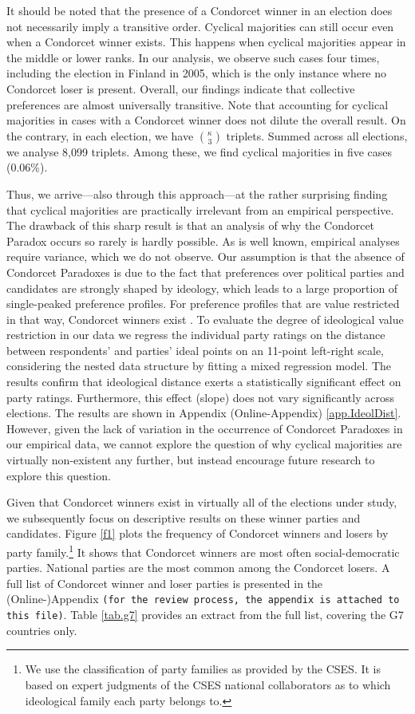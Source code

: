 \documentclass[12pt]{scrartcl}
\begin{document}
It should be noted that the presence of a Condorcet winner in an election does not necessarily imply a transitive order. Cyclical majorities can still occur even when a Condorcet winner exists. This happens when cyclical majorities appear in the middle or lower ranks. In our analysis, we observe such cases four times, including the election in Finland in 2005, which is the only instance where no Condorcet loser is present. Overall, our findings indicate that collective preferences are almost universally transitive. Note that accounting for cyclical majorities in cases with a Condorcet winner does not dilute the overall result. On the contrary, in each election, we have $\binom{\kappa}{3}$ triplets. Summed across all elections, we analyse 8,099 triplets. Among these, we find cyclical majorities in five cases (0.06\%).

Thus, we arrive—also through this approach—at the rather surprising finding that cyclical majorities are practically irrelevant from an empirical perspective. The drawback of this sharp result is that an analysis of why the Condorcet Paradox occurs so rarely is hardly possible. As is well known, empirical analyses require variance, which we do not observe. Our assumption is that the absence of Condorcet Paradoxes is  due to the fact that preferences over political parties and candidates are strongly shaped by ideology, which leads to a large proportion of single-peaked preference profiles. For preference profiles that are value restricted in that way, Condorcet winners exist \citep{Black1958, Sen1966}. To evaluate the degree of ideological value restriction in our data we regress the individual party  ratings on the distance between respondents' and parties' ideal points on an 11-point left-right scale, considering the nested data structure by fitting a mixed regression model. The results confirm that ideological distance exerts a statistically significant effect on party ratings. Furthermore, this effect (slope) does not vary significantly across elections. The results are shown in Appendix (Online-Appendix) \ref{app.IdeolDist}. However, given the lack of variation in the occurrence of Condorcet Paradoxes in our empirical data, we cannot explore the question of why cyclical majorities are virtually non-existent any further, but instead encourage future research to explore this question.

Given that Condorcet winners exist in virtually all of the elections under study, we subsequently focus on descriptive results on these winner parties and candidates. Figure \ref{f1} plots the frequency of Condorcet winners and losers by party family.\footnote{
    We use the classification of party families as provided by the CSES. It is based on expert judgments of the CSES national collaborators as to which ideological family each party belongs to. 
} It shows that Condorcet winners are most often social-democratic parties. National parties are the most common among the Condorcet losers. A full list of Condorcet winner and loser parties is presented in the (Online-)Appendix \texttt{(for the review process, the appendix is attached to this file)}. Table \ref{tab.g7} provides an extract from the full list, covering the G7 countries only.
\end{document}
